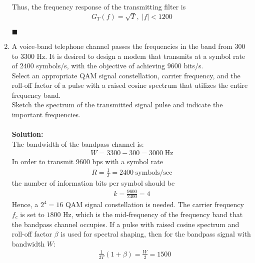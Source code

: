 \documentclass[a4paper,12pt]{article}
\begin{document}
\begin{enumerate}
\begin{align*}
            \end{align*}
            Thus, the frequency response of the transmitting filter is 
            \begin{align*}
                G_T(f) = \sqrt{T}, \; |f| < 1200
            \end{align*}
            \begin{flushright}
                $\blacksquare$
            \end{flushright}
        \item 
            A voice-band telephone channel passes the frequencies in the band from $300$ to $3300$ Hz. It is desired to design a modem that transmits at a symbol rate of $2400$ symbols/s, with the objective of achieving $9600$ bits/s. \\
            Select an appropriate QAM signal constellation, carrier frequency, and the roll-off factor of a pulse with a raised cosine spectrum that utilizes the entire frequency band. \\
            Sketch the spectrum of the transmitted signal pulse and indicate the important frequencies. \\ \\ 
            \textbf{Solution:} \\
            The bandwidth of the bandpass channel is:
            \begin{align*}
                W = 3300 - 300 = 3000 \; \text{Hz}
            \end{align*}
            In order to transmit $9600$ bps with a symbol rate
            \begin{align*}
                R = \frac{1}{T} = 2400 \; \text{symbols/sec}
            \end{align*}
            the number of information bits per symbol should be
            \begin{align*}
                k = \frac{9600}{2400} = 4
            \end{align*}
            Hence, a $2^4 = 16$ QAM signal constellation is needed. The carrier frequency $f_c$ is set to $1800$ Hz, which is the mid-frequency of the frequency band that the bandpass channel occupies. If a pulse with raised cosine spectrum and roll-off factor $\beta$ is used for spectral shaping, then for the bandpass signal with bandwidth $W$:
            \begin{align*}
                & \frac{1}{2T}(1 + \beta) = \frac{W}{2} = 1500 \\

\end{align*}
\end{enumerate}
\end{document}
